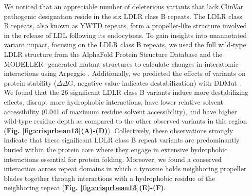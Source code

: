 \documentclass[a4paper, titlepage, openright]{book}
\begin{document}
We noticed that an appreciable number of deleterious variants that lack ClinVar pathogenic designation reside in the six LDLR class B repeats. The LDLR class B repeats, also known as YWTD repeats, form a propeller-like structure involved in the release of LDL following its endocytosis. To gain insights into unannotated variant impact, focusing on the LDLR class B repeats, we used the full wild-type LDLR structure from the AlphaFold Protein Structure Database \citep{jumper2021highly, varadi2022alphafold} and the MODELLER \citep{webb2016comparative} -generated mutant structures to calculate changes in interatomic interactions using Arpeggio \citep{jubb2017arpeggio}. Additionally, we predicted the effects of variants on protein stability ($\Delta\Delta$G, negative value indicates destabilization) with DDMut \citep{zhou2023ddmut}. We found that the 26 significant LDLR class B variants induce more destabilizing effects, disrupt more hydrophobic interactions, have lower relative solvent accessibility \citep{rose1985hydrophobicity} (0.041 of maximum residue solvent accessibility), and have higher wild-type residue depth as compared to the other observed variants in this region (\textbf{Fig. \ref{fig:crisprbean13}(A)-(D)}). Collectively, these observations strongly indicate that these significant LDLR class B repeat variants are predominantly buried within the protein core where they engage in extensive hydrophobic interactions essential for protein folding. Moreover, we found a conserved interaction across repeat domains in which a tyrosine holds neighboring propeller blades together through interactions with a hydrophobic residue of the neighboring repeat (\textbf{Fig. \ref{fig:crisprbean13}(E)-(F)}. 
\end{document}
